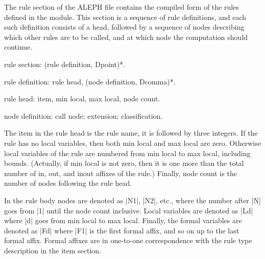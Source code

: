 \documentclass[titlepage]{article}
\newcommand\A{\textsf{ALEPH}}
\newenvironment{grammar}{%
\begin{list}{}{%
\setlength\leftmargin{18pt}%
\setlength\rightmargin{-5pt}%
\setlength\listparindent{20pt}%
\setlength\itemsep{1pt plus0.2ex}%
\setlength\parsep{0pt plus 2pt}%
\setlength\labelsep{-5pt}%
}\color{blue!90!black}\sf\mkoptions%
}{\end{list}}
\newcommand\g[1]{\textsf{\color{blue!90!black}#1}}
\begin{document}
The \g{rule section} of the \A{} file contains the compiled form of the
rules defined in the module. This section is a sequence of \g{rule
definition}s, and each such definition consists of a head, followed by a 
sequence of \g{node}s describing which other rules are to be called, and at
which node the computation should continue.
\begin{grammar}
\item rule section: (rule definition, Dpoint)*.
\item rule definition: rule head, (node definition, Dcomma)*.
\item rule head: item, min local, max local, node count.
\item node definition: call node; extension; classification.
\end{grammar}
The \g{item} in the \g{rule head} is the rule name, it is followed by three
integers. If the rule has no local
variables, then both \g{min local} and \g{max local} are zero. Otherwise
local variables of the rule
are numbered from \g{min local} to \g{max local}, including bounds.
(Actually, if \g{min local} is not zero, then it is one more than the total
number of in, out, and inout affixes of the rule.) Finally, \g{node count} 
is the number of nodes following the rule head. 

In the rule body nodes are denoted as \pp|N1|, \pp|N2|, etc., where the
number after \pp|N| goes from \pp|1| until the node count inclusive. Local
variables are denoted as \pp|Ld| where \pp|d| goes from \g{min local} to
\g{max local}. Finally, the formal variables are denoted as \pp|Fd| where
\pp|F1| is the first formal affix, and so on up to the
last formal affix. Formal affixes are in one-to-one
correspondence with the rule type description in the \g{item section}.
\end{document}
